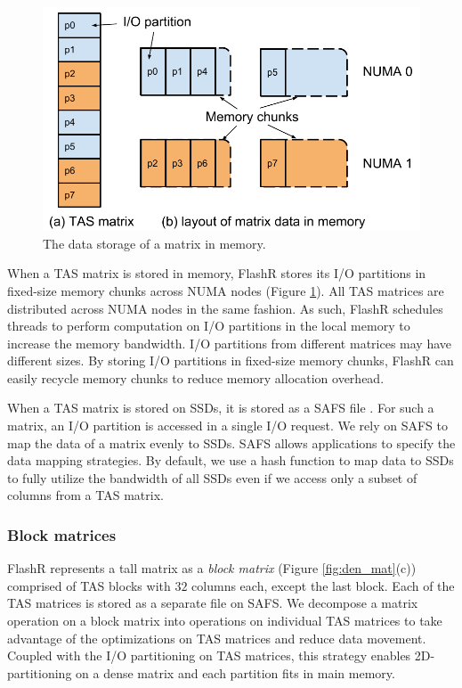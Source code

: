 \begin{figure}
	\centering
	\includegraphics[scale=0.4]{FlashMatrix_figs/matrix_mem.pdf}
	\caption{The data storage of a matrix in memory.}
	\label{fig:mem_store}
  \vspace{-12pt}
\end{figure}

When a TAS matrix is stored in memory, FlashR stores its I/O partitions in
fixed-size memory chunks across NUMA nodes (Figure \ref{fig:mem_store}).
All TAS matrices are distributed across NUMA nodes in the same fashion. 
As such, FlashR schedules threads to perform computation on I/O partitions in
the local memory to increase the memory bandwidth. I/O partitions from
different matrices may have different sizes. By storing I/O partitions in
fixed-size memory chunks, FlashR can easily recycle memory chunks to reduce
memory allocation overhead.

When a TAS matrix is stored on SSDs, it is stored as a SAFS file \cite{safs}.
For such a matrix, an I/O partition is accessed in a single I/O request.
We rely on SAFS to map the data of a matrix evenly to SSDs. SAFS allows
applications to specify the data mapping strategies. By default, we use
a hash function to map data to SSDs to fully utilize the bandwidth of all SSDs
even if we access only a subset of columns from a TAS matrix.

\subsubsection{Block matrices} \label{sec:block_mat}
FlashR represents a tall matrix as a \textit{block matrix} 
(Figure \ref{fig:den_mat}(c)) comprised of TAS blocks with $32$ columns each,
except the last block. 
Each of the TAS matrices is stored as a separate file on SAFS. 
We decompose a matrix operation
on a block matrix into operations on individual TAS matrices to take advantage
of the optimizations on TAS matrices and reduce data movement.
Coupled with the I/O partitioning on TAS matrices, this strategy enables
2D-partitioning on a dense matrix and each partition fits in main memory.

